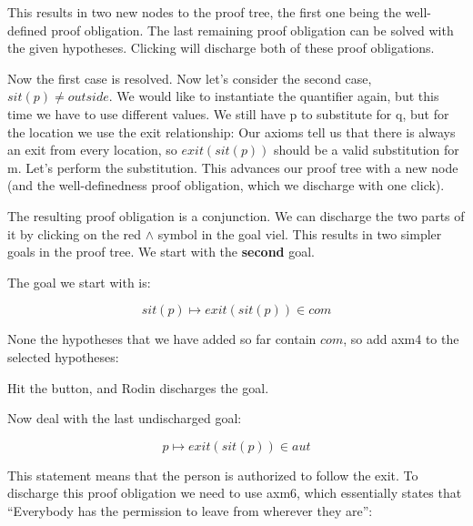 This results in two new nodes to the proof tree, the first one being the well-defined proof obligation.  The last remaining proof obligation can be solved with the given hypotheses.  Clicking  will discharge both of these proof obligations.

Now the first case is resolved.  Now let's consider the second case, $sit(p) \neq outside$.  We would like to instantiate the quantifier again, but this time we have to use different values.  We still have p to substitute for q, but for the location we use the exit relationship: Our axioms tell us that there is always an exit from every location, so $exit(sit(p))$ should be a valid substitution for m. Let's perform the substitution.  This advances our proof tree with a new node (and the well-definedness proof obligation, which we discharge with one click).

The resulting proof obligation is a conjunction.  We can discharge the two parts of it by clicking on the red $\land$ symbol in the goal viel. This results in two simpler goals in the proof tree.  We start with the \textbf{second} goal.


The goal we start with is:

$$ sit(p) \mapsto exit(sit(p)) \in com $$

None the hypotheses that we have added so far contain $com$, so add \textsf{axm4} to the selected hypotheses:


Hit the  button, and Rodin discharges the goal.

Now deal with the last undischarged goal:

$$ p \mapsto exit(sit(p)) \in aut $$

This statement means that the person is authorized to follow the exit. To discharge this proof obligation we need to use \textsf{axm6}, which essentially states that ``Everybody has the permission to leave from wherever they are'':

